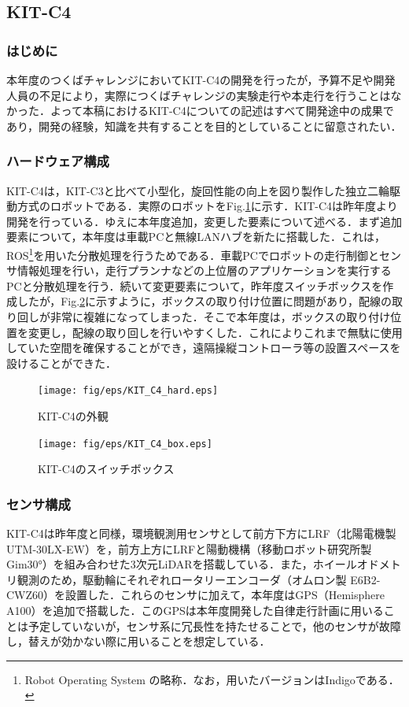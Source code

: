 \documentclass[10pt,a4paper]{jarticle}
\begin{document}
\subsection{KIT-C4}
\subsubsection{はじめに}
本年度のつくばチャレンジにおいてKIT-C4の開発を行ったが，予算不足や開発人員の不足により，実際につくばチャレンジの実験走行や本走行を行うことはなかった．よって本稿におけるKIT-C4についての記述はすべて開発途中の成果であり，開発の経験，知識を共有することを目的としていることに留意されたい．

\subsubsection{ハードウェア構成}
KIT-C4は，KIT-C3と比べて小型化，旋回性能の向上を図り製作した独立二輪駆動方式のロボットである．実際のロボットをFig.\ref{KIT_C4_hard}に示す．KIT-C4は昨年度より開発を行っている．ゆえに本年度追加，変更した要素について述べる．まず追加要素について，本年度は車載PCと無線LANハブを新たに搭載した．これは，ROS\footnote{Robot Operating System の略称．なお，用いたバージョンはIndigoである．}を用いた分散処理を行うためである．車載PCでロボットの走行制御とセンサ情報処理を行い，走行プランナなどの上位層のアプリケーションを実行するPCと分散処理を行う．続いて変更要素について，昨年度スイッチボックスを作成したが，Fig.\ref{KIT_C4_box}に示すように，ボックスの取り付け位置に問題があり，配線の取り回しが非常に複雑になってしまった．そこで本年度は，ボックスの取り付け位置を変更し，配線の取り回しを行いやすくした．これによりこれまで無駄に使用していた空間を確保することができ，遠隔操縦コントローラ等の設置スペースを設けることができた．

\begin{figure}[tbp]
  \centering
  \texttt{[image: fig/eps/KIT\_C4\_hard.eps]}
  \caption{KIT-C4の外観}
  \label{KIT_C4_hard}
\end{figure}

\begin{figure}[tbp]
  \centering
  \texttt{[image: fig/eps/KIT\_C4\_box.eps]}
  \caption{KIT-C4のスイッチボックス}
  \label{KIT_C4_box}
\end{figure}


\subsubsection{センサ構成}
KIT-C4は昨年度と同様，環境観測用センサとして前方下方にLRF（北陽電機製 UTM-30LX-EW）を，前方上方にLRFと陽動機構（移動ロボット研究所製 Gim30°）を組み合わせた3次元LiDARを搭載している．また，ホイールオドメトリ観測のため，駆動輪にそれぞれロータリーエンコーダ（オムロン製 E6B2-CWZ60）を設置した．これらのセンサに加えて，本年度はGPS（Hemisphere A100）を追加で搭載した．このGPSは本年度開発した自律走行計画に用いることは予定していないが，センサ系に冗長性を持たせることで，他のセンサが故障し，替えが効かない際に用いることを想定している．
\end{document}
